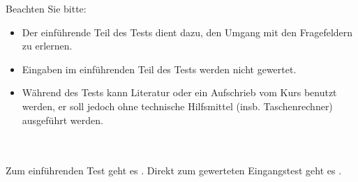 



\Mtikzexternalize




\begin{MSectionStart}
\MGlobalSTestTag
{}

Beachten Sie bitte:

\begin{itemize}
\item{Der einführende Teil des Tests dient dazu, den Umgang mit den Fragefeldern zu erlernen.}
\item{Eingaben im einführenden Teil des Tests werden nicht gewertet.}
\item{Während des Tests kann Literatur oder ein Aufschrieb vom Kurs benutzt werden, er soll jedoch ohne technische Hilfsmittel (insb. Taschenrechner) ausgeführt werden.}
\end{itemize}

\ \\ \ \\
Zum einführenden Test geht es .
Direkt zum gewerteten Eingangstest geht es .

\end{MSectionStart}

